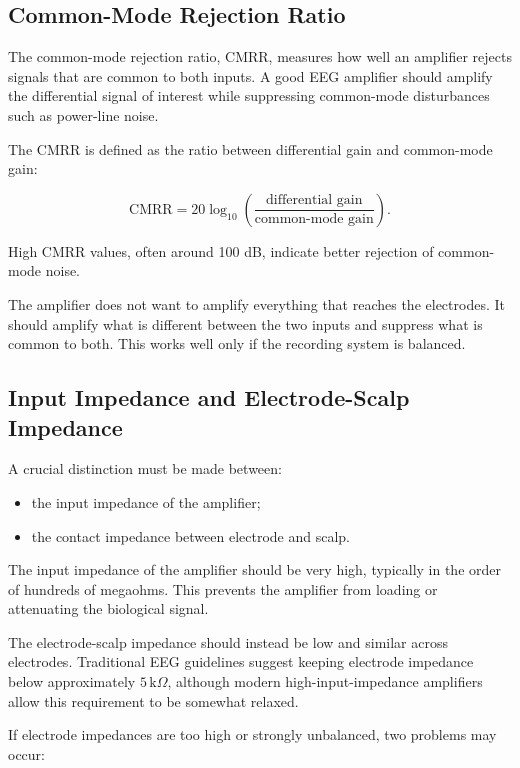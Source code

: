 \subsection{Common-Mode Rejection Ratio}

The common-mode rejection ratio, CMRR, measures how well an amplifier rejects signals that are common to both inputs. A good EEG amplifier should amplify the differential signal of interest while suppressing common-mode disturbances such as power-line noise.

The CMRR is defined as the ratio between differential gain and common-mode gain:

\[
\text{CMRR} =
20 \log_{10}
\left(
\frac{\text{differential gain}}
{\text{common-mode gain}}
\right).
\]

High CMRR values, often around 100 dB, indicate better rejection of common-mode noise.

\begin{authornote}
The amplifier does not want to amplify everything that reaches the electrodes. It should amplify what is different between the two inputs and suppress what is common to both. This works well only if the recording system is balanced.
\end{authornote}

\subsection{Input Impedance and Electrode-Scalp Impedance}

A crucial distinction must be made between:

\begin{itemize}[noitemsep]
    \item the input impedance of the amplifier;
    \item the contact impedance between electrode and scalp.
\end{itemize}

The input impedance of the amplifier should be very high, typically in the order of hundreds of megaohms. This prevents the amplifier from loading or attenuating the biological signal.

The electrode-scalp impedance should instead be low and similar across electrodes. Traditional EEG guidelines suggest keeping electrode impedance below approximately $5\,\text{k}\Omega$, although modern high-input-impedance amplifiers allow this requirement to be somewhat relaxed.

If electrode impedances are too high or strongly unbalanced, two problems may occur:

